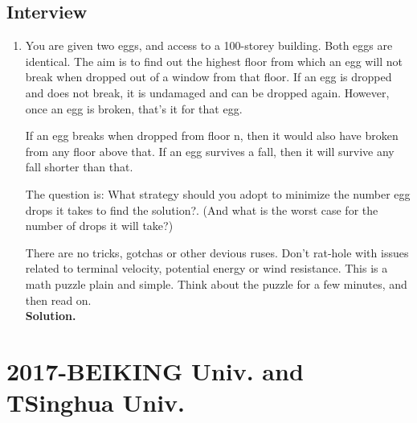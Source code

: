 \documentclass[11pt,a4paper]{article}
\begin{document}
\subsection{Interview}
\begin{enumerate}
	\item You are given two eggs, and access to a 100-storey building. Both eggs are identical. The aim is to find out the highest floor from which an egg will not break when dropped out of a window from that floor. If an egg is dropped and does not break, it is undamaged and can be dropped again. However, once an egg is broken, that’s it for that egg. 
	

	If an egg breaks when dropped from floor n, then it would also have broken from any floor above that. If an egg survives a fall, then it will survive any fall shorter than that.

	
	The question is: What strategy should you adopt to minimize the number egg drops it takes to find the solution?. (And what is the worst case for the number of drops it will take?)


	There are no tricks, gotchas or other devious ruses. Don’t rat-hole with issues related to terminal velocity, potential energy or wind resistance. This is a math puzzle plain and simple.
	Think about the puzzle for a few minutes, and then read on. 
\\\textbf{Solution.} \\

\end{enumerate}
\newpage
\section{2017-BEIKING Univ. and TSinghua Univ.}
\end{document}
